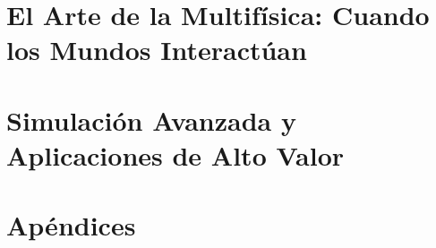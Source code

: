 \documentclass[
    11pt,
    a4paper,
    spanish,
    twoside,
    openright,
    cleardoublepage=empty,
    numbers=noenddot,
    bibliography=totoc,
    index=totoc
]{scrbook}
\begin{document}
\part{El Arte de la Multifísica: Cuando los Mundos Interactúan}
%
%
%
\cleardoublepage

\part{Simulación Avanzada y Aplicaciones de Alto Valor}
%
%
%
\cleardoublepage

\appendix
\part*{Apéndices}



%
%
\cleardoublepage

\printbibliography[heading=bibintoc,title={Referencias}]
\end{document}
